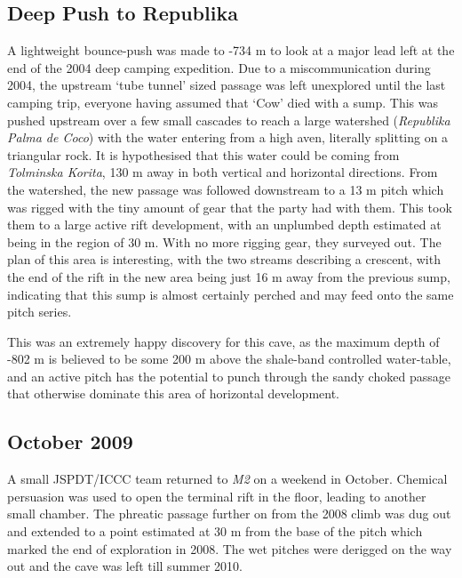 \hypertarget{deep-push-to-republika}{%
\subsection{Deep Push to Republika}\label{deep-push-to-republika}}

A lightweight bounce-push was made to -734 m to look at a major lead
left at the end of the 2004 deep camping expedition. Due to a
miscommunication during 2004, the upstream `tube tunnel' sized passage
was left unexplored until the last camping trip, everyone having assumed
that `Cow' died with a sump. This was pushed upstream over a few small
cascades to reach a large watershed (\emph{Republika Palma de Coco})
with the water entering from a high aven, literally splitting on a
triangular rock. It is hypothesised that this water could be coming from
\emph{Tolminska Korita}, 130 m away in both vertical and horizontal
directions. From the watershed, the new passage was followed downstream
to a 13 m pitch which was rigged with the tiny amount of gear that the
party had with them. This took them to a large active rift development,
with an unplumbed depth estimated at being in the region of 30 m. With
no more rigging gear, they surveyed out. The plan of this area is
interesting, with the two streams describing a crescent, with the end of
the rift in the new area being just 16 m away from the previous sump,
indicating that this sump is almost certainly perched and may feed onto
the same pitch series.

This was an extremely happy discovery for this cave, as the maximum
depth of -802 m is believed to be some 200 m above the shale-band
controlled water-table, and an active pitch has the potential to punch
through the sandy choked passage that otherwise dominate this area of
horizontal development.

\hypertarget{october-2009}{%
\subsection{October 2009}\label{october-2009}}

A small JSPDT/ICCC team returned to \emph{M2} on a weekend in October.
Chemical persuasion was used to open the terminal rift in the floor,
leading to another small chamber. The phreatic passage further on from
the 2008 climb was dug out and extended to a point estimated at 30 m
from the base of the pitch which marked the end of exploration in 2008.
The wet pitches were derigged on the way out and the cave was left till
summer 2010.

